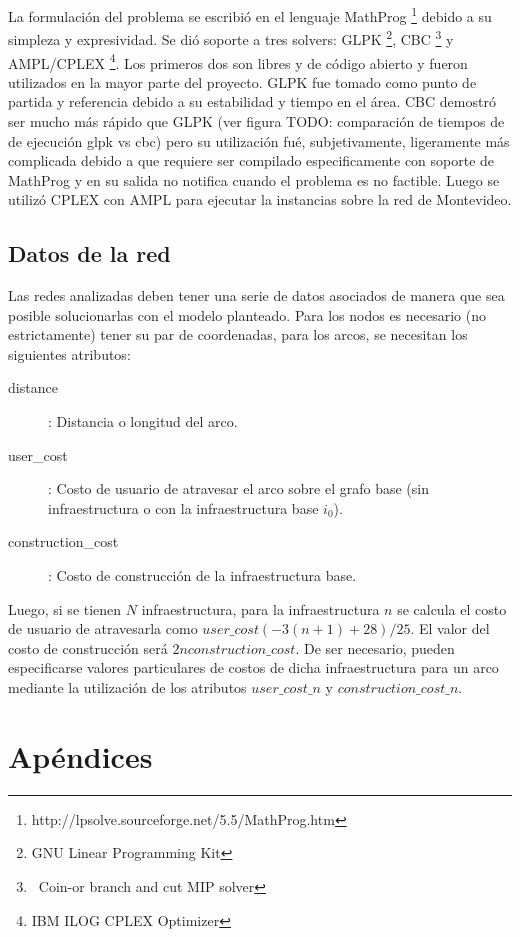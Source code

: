\documentclass{article}
\begin{document}
  La formulación del problema se escribió en el lenguaje MathProg \footnote{http://lpsolve.sourceforge.net/5.5/MathProg.htm} debido a su simpleza y expresividad. Se dió soporte a tres solvers: GLPK \footnote{GNU Linear Programming Kit}, CBC \footnote{\ Coin-or branch and cut MIP solver} y AMPL/CPLEX \footnote{IBM ILOG CPLEX Optimizer}. Los primeros dos son libres y de código abierto y fueron utilizados en la mayor parte del proyecto. GLPK fue tomado como punto de partida y referencia debido a su estabilidad y tiempo en el área. CBC demostró ser mucho más rápido que GLPK (ver figura TODO: comparación de tiempos de de ejecución glpk vs cbc) pero su utilización fué, subjetivamente, ligeramente más complicada debido a que requiere ser compilado especificamente con soporte de MathProg y en su salida no notifica cuando el problema es no factible. Luego se utilizó CPLEX con AMPL para ejecutar la instancias sobre la red de Montevideo.

  \subsection*{Datos de la red}

  Las redes analizadas deben tener una serie de datos asociados de manera que sea posible solucionarlas con el modelo planteado. Para los nodos es necesario (no estrictamente) tener su par de coordenadas, para los arcos, se necesitan los siguientes atributos:

  \begin{description}
    \item[distance]: Distancia o longitud del arco.
    \item[user\_cost]: Costo de usuario de atravesar el arco sobre el grafo base (sin infraestructura o con la infraestructura base $i_0$).
    \item[construction\_cost]: Costo de construcción de la infraestructura base.
  \end{description}

  Luego, si se tienen $N$ infraestructura, para la infraestructura $n$ se calcula el costo de usuario de atravesarla como $user\_cost (-3 (n + 1) + 28) / 25$. El valor del costo de construcción será $2 n construction\_cost$. De ser necesario, pueden especificarse valores particulares de costos de dicha infraestructura para un arco mediante la utilización de los atributos $user\_cost\_n$ y $construction\_cost\_n$.

  \section*{Apéndices}
\end{document}
